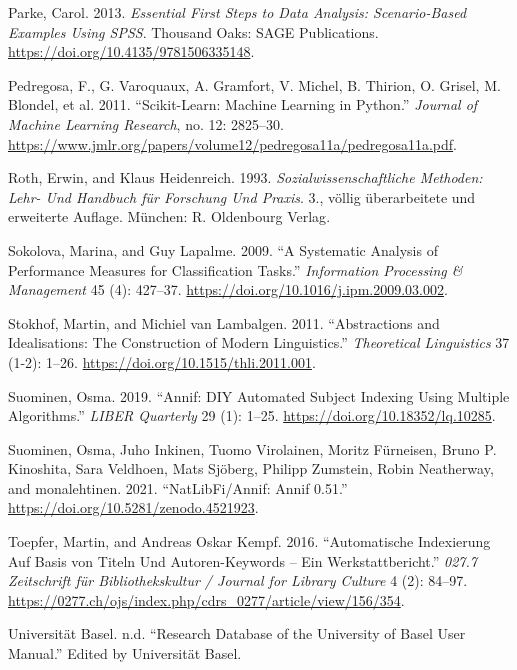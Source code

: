 \begin{CSLReferences}{1}{0}
\leavevmode\hypertarget{ref-Parke.2013}{}%
Parke, Carol. 2013. \emph{Essential First Steps to Data Analysis:
Scenario-Based Examples Using SPSS}. Thousand Oaks: {SAGE Publications}.
\url{https://doi.org/10.4135/9781506335148}.

\leavevmode\hypertarget{ref-Pedregosa.2011}{}%
Pedregosa, F., G. Varoquaux, A. Gramfort, V. Michel, B. Thirion, O.
Grisel, M. Blondel, et al. 2011. {``Scikit-Learn: Machine Learning in
Python.''} \emph{Journal of Machine Learning Research}, no. 12:
2825--30.
\url{https://www.jmlr.org/papers/volume12/pedregosa11a/pedregosa11a.pdf}.

\leavevmode\hypertarget{ref-Roth.1993}{}%
Roth, Erwin, and Klaus Heidenreich. 1993. \emph{Sozialwissenschaftliche
Methoden: Lehr- Und Handbuch f{ü}r Forschung Und Praxis}. 3., v{ö}llig
{ü}berarbeitete und erweiterte Auflage. M{ü}nchen: {R. Oldenbourg
Verlag}.

\leavevmode\hypertarget{ref-Sokolova.2009}{}%
Sokolova, Marina, and Guy Lapalme. 2009. {``A Systematic Analysis of
Performance Measures for Classification Tasks.''} \emph{Information
Processing {\&} Management} 45 (4): 427--37.
\url{https://doi.org/10.1016/j.ipm.2009.03.002}.

\leavevmode\hypertarget{ref-Stokhof.2011}{}%
Stokhof, Martin, and Michiel van Lambalgen. 2011. {``Abstractions and
Idealisations: The Construction of Modern Linguistics.''}
\emph{Theoretical Linguistics} 37 (1-2): 1--26.
\url{https://doi.org/10.1515/thli.2011.001}.

\leavevmode\hypertarget{ref-Suominen.2019}{}%
Suominen, Osma. 2019. {``Annif: DIY Automated Subject Indexing Using
Multiple Algorithms.''} \emph{LIBER Quarterly} 29 (1): 1--25.
\url{https://doi.org/10.18352/lq.10285}.

\leavevmode\hypertarget{ref-Suominen.2021}{}%
Suominen, Osma, Juho Inkinen, Tuomo Virolainen, Moritz Fürneisen, Bruno
P. Kinoshita, Sara Veldhoen, Mats Sjöberg, Philipp Zumstein, Robin
Neatherway, and monalehtinen. 2021. {``NatLibFi/Annif: Annif 0.51.''}
\url{https://doi.org/10.5281/zenodo.4521923}.

\leavevmode\hypertarget{ref-Toepfer.2016}{}%
Toepfer, Martin, and Andreas Oskar Kempf. 2016. {``Automatische
Indexierung Auf Basis von Titeln Und Autoren-Keywords -- Ein
Werkstattbericht.''} \emph{027.7 Zeitschrift f{ü}r Bibliothekskultur /
Journal for Library Culture} 4 (2): 84--97.
\url{https://0277.ch/ojs/index.php/cdrs_0277/article/view/156/354}.

\leavevmode\hypertarget{ref-UniversitatBasel.2021}{}%
Universität Basel. n.d. {``Research Database of the University of Basel
User Manual.''} Edited by Universität Basel.

\end{CSLReferences}
